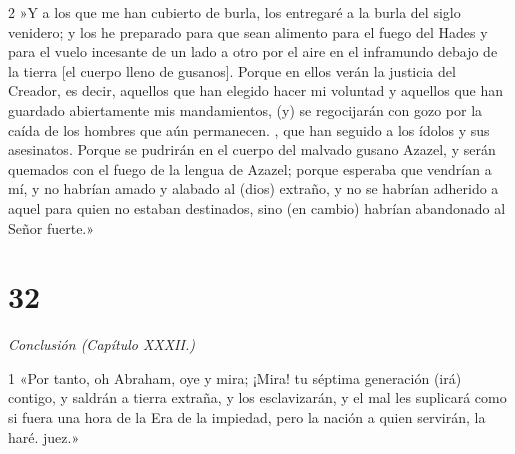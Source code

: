 \par 2 »Y a los que me han cubierto de burla, los entregaré a la burla del siglo venidero; y los he preparado para que sean alimento para el fuego del Hades y para el vuelo incesante de un lado a otro por el aire en el inframundo debajo de la tierra [el cuerpo lleno de gusanos]. Porque en ellos verán la justicia del Creador, es decir, aquellos que han elegido hacer mi voluntad y aquellos que han guardado abiertamente mis mandamientos, (y) se regocijarán con gozo por la caída de los hombres que aún permanecen. , que han seguido a los ídolos y sus asesinatos. Porque se pudrirán en el cuerpo del malvado gusano Azazel, y serán quemados con el fuego de la lengua de Azazel; porque esperaba que vendrían a mí, y no habrían amado y alabado al (dios) extraño, y no se habrían adherido a aquel para quien no estaban destinados, sino (en cambio) habrían abandonado al Señor fuerte.»

\chapter{32}

\par \textit{Conclusión (Capítulo XXXII.)}

\par 1 «Por tanto, oh Abraham, oye y mira; ¡Mira! tu séptima generación (irá) contigo, y saldrán a tierra extraña, y los esclavizarán, y el mal les suplicará como si fuera una hora de la Era de la impiedad, pero la nación a quien servirán, la haré. juez.»

